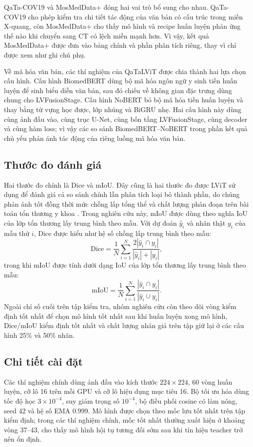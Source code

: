 QaTa-COV19 và MosMedData+ đóng hai vai trò bổ sung cho nhau. QaTa-COV19 cho phép kiểm tra chi tiết tác động của văn bản có cấu trúc trong miền X-quang, còn MosMedData+ cho thấy mô hình và recipe huấn luyện phản ứng thế nào khi chuyển sang CT có lệch miền mạnh hơn. Vì vậy, kết quả MosMedData+ được đưa vào bảng chính và phần phân tích riêng, thay vì chỉ được xem như ghi chú phụ.

Về mã hóa văn bản, các thí nghiệm của QaTaLViT được chia thành hai lựa chọn cấu hình. Cấu hình BiomedBERT dùng bộ mã hóa ngôn ngữ y sinh tiền huấn luyện để sinh biểu diễn văn bản, sau đó chiếu về không gian đặc trưng dùng chung cho LVFusionStage. Cấu hình NoBERT bỏ bộ mã hóa tiền huấn luyện và thay bằng từ vựng học được, lớp nhúng và BiGRU nhẹ. Hai cấu hình này dùng cùng ảnh đầu vào, cùng trục U-Net, cùng bốn tầng LVFusionStage, cùng decoder và cùng hàm loss; vì vậy các so sánh BiomedBERT--NoBERT trong phần kết quả chủ yếu phản ánh tác động của riêng luồng mã hóa văn bản.

\subsection{Thước đo đánh giá}

Hai thước đo chính là Dice và mIoU. Đây cũng là hai thước đo được LViT sử dụng để đánh giá cả so sánh chính lẫn phân tích loại bỏ thành phần, do chúng phản ánh tốt đồng thời mức chồng lấp tổng thể và chất lượng phân đoạn trên bài toán tổn thương y khoa \cite{li2023lvit}. Trong nghiên cứu này, mIoU được dùng theo nghĩa IoU của lớp tổn thương lấy trung bình theo mẫu. Với dự đoán \(\hat{y}_i\) và nhãn thật \(y_i\) của mẫu thứ \(i\), Dice được hiểu như hệ số chồng lấp trung bình theo mẫu:
\[
\mathrm{Dice} =
\frac{1}{N}\sum_{i=1}^{N}
\frac{2|\hat{y}_i\cap y_i|}{|\hat{y}_i|+|y_i|},
\]
trong khi mIoU được tính dưới dạng IoU của lớp tổn thương lấy trung bình theo mẫu:
\[
\mathrm{mIoU} = \frac{1}{N}\sum_{i=1}^{N}\frac{|\hat{y}_i\cap y_i|}{|\hat{y}_i\cup y_i|}.
\]
Ngoài chỉ số cuối trên tập kiểm tra, nhóm nghiên cứu còn theo dõi vòng kiểm định tốt nhất để chọn mô hình tốt nhất sau khi huấn luyện xong mô hình, Dice/mIoU kiểm định tốt nhất và chất lượng nhãn giả trên tập giữ lại ở các cấu hình 25\% và 50\% nhãn.

\subsection{Chi tiết cài đặt}

Các thí nghiệm chính dùng ảnh đầu vào kích thước \(224\times224\), 60 vòng huấn luyện, cỡ lô 16 trên mỗi GPU và cỡ lô hiệu dụng mục tiêu 16. Bộ tối ưu hóa dùng tốc độ học \(3\times10^{-4}\), suy giảm trọng số \(10^{-4}\), bộ điều phối cosine có làm nóng, seed 42 và hệ số EMA 0.999. Mô hình được chọn theo mốc lưu tốt nhất trên tập kiểm định; trong các thí nghiệm chính, mốc tốt nhất thường xuất hiện ở khoảng vòng 37--43, cho thấy mô hình hội tụ tương đối sớm sau khi tín hiệu teacher trở nên ổn định.

